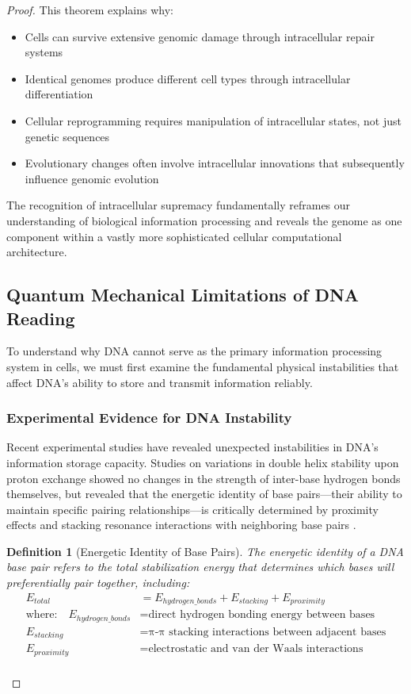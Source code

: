 \documentclass[12pt,a4paper]{article}
\newtheorem{definition}[theorem]{Definition}
\begin{document}
\begin{proof}
This theorem explains why:
\begin{itemize}
\item Cells can survive extensive genomic damage through intracellular repair systems
\item Identical genomes produce different cell types through intracellular differentiation
\item Cellular reprogramming requires manipulation of intracellular states, not just genetic sequences
\item Evolutionary changes often involve intracellular innovations that subsequently influence genomic evolution
\end{itemize}

The recognition of intracellular supremacy fundamentally reframes our understanding of biological information processing and reveals the genome as one component within a vastly more sophisticated cellular computational architecture.


\subsection{Quantum Mechanical Limitations of DNA Reading}

To understand why DNA cannot serve as the primary information processing system in cells, we must first examine the fundamental physical instabilities that affect DNA's ability to store and transmit information reliably.

\subsubsection{Experimental Evidence for DNA Instability}

Recent experimental studies have revealed unexpected instabilities in DNA's information storage capacity. Studies on variations in double helix stability upon proton exchange showed no changes in the strength of inter-base hydrogen bonds themselves, but revealed that the energetic identity of base pairs—their ability to maintain specific pairing relationships—is critically determined by proximity effects and stacking resonance interactions with neighboring base pairs \cite{schulten1999biomolecular}.

\begin{definition}[Energetic Identity of Base Pairs]
The energetic identity of a DNA base pair refers to the total stabilization energy that determines which bases will preferentially pair together, including:
\begin{align}
E_{total} &= E_{hydrogen\_bonds} + E_{stacking} + E_{proximity} \\
\text{where:} \quad E_{hydrogen\_bonds} &= \text{direct hydrogen bonding energy between bases} \\
E_{stacking} &= \text{π-π stacking interactions between adjacent bases} \\
E_{proximity} &= \text{electrostatic and van der Waals interactions}\\
\end{align}
\end{definition}


\end{proof}
\end{document}
